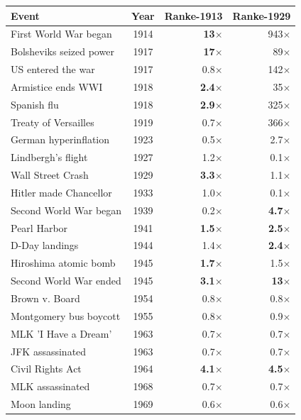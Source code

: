\begin{tabular}{lc rr}
\toprule
Event & Year & Ranke-1913 & Ranke-1929 \\
\midrule
First World War began & 1914 & \textbf{13$\times$} & 943$\times$ \\
Bolsheviks seized power & 1917 & \textbf{17$\times$} & 89$\times$ \\
US entered the war & 1917 & 0.8$\times$ & 142$\times$ \\
Armistice ends WWI & 1918 & \textbf{2.4$\times$} & 35$\times$ \\
Spanish flu & 1918 & \textbf{2.9$\times$} & 325$\times$ \\
Treaty of Versailles & 1919 & 0.7$\times$ & 366$\times$ \\
German hyperinflation & 1923 & 0.5$\times$ & 2.7$\times$ \\
Lindbergh's flight & 1927 & 1.2$\times$ & 0.1$\times$ \\
Wall Street Crash & 1929 & \textbf{3.3$\times$} & 1.1$\times$ \\
Hitler made Chancellor & 1933 & 1.0$\times$ & 0.1$\times$ \\
Second World War began & 1939 & 0.2$\times$ & \textbf{4.7$\times$} \\
Pearl Harbor & 1941 & \textbf{1.5$\times$} & \textbf{2.5$\times$} \\
D-Day landings & 1944 & 1.4$\times$ & \textbf{2.4$\times$} \\
Hiroshima atomic bomb & 1945 & \textbf{1.7$\times$} & 1.5$\times$ \\
Second World War ended & 1945 & \textbf{3.1$\times$} & \textbf{13$\times$} \\
Brown v. Board & 1954 & 0.8$\times$ & 0.8$\times$ \\
Montgomery bus boycott & 1955 & 0.8$\times$ & 0.9$\times$ \\
MLK 'I Have a Dream' & 1963 & 0.7$\times$ & 0.7$\times$ \\
JFK assassinated & 1963 & 0.7$\times$ & 0.7$\times$ \\
Civil Rights Act & 1964 & \textbf{4.1$\times$} & \textbf{4.5$\times$} \\
MLK assassinated & 1968 & 0.7$\times$ & 0.7$\times$ \\
Moon landing & 1969 & 0.6$\times$ & 0.6$\times$ \\
\bottomrule
\end{tabular}